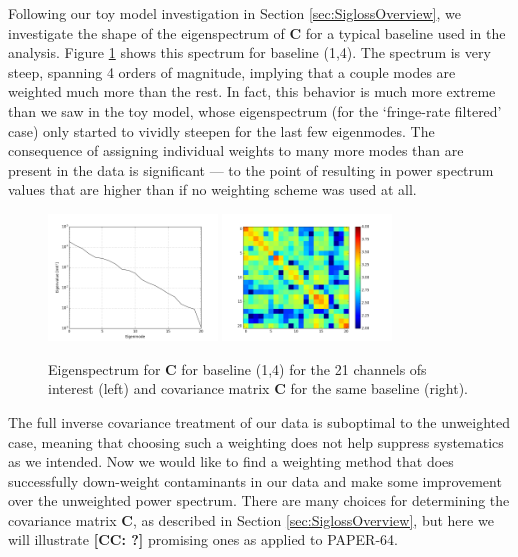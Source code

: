 \documentclass[preprint2,numberedappendix,tighten]{aastex6}  %
\newcommand{\cc}[1]{{\color{purple} \textbf{[CC: #1]}}}
\begin{document}
Following our toy model investigation in Section \ref{sec:SiglossOverview}, we investigate the shape of the eigenspectrum of $\textbf{C}$ for a typical baseline used in the analysis. Figure \ref{fig:eigenspectrum} shows this spectrum for baseline (1,4). The spectrum is very steep, spanning 4 orders of magnitude, implying that a couple modes are weighted much more than the rest. In fact, this behavior is much more extreme than we saw in the toy model, whose eigenspectrum (for the `fringe-rate filtered' case) only started to vividly steepen for the last few eigenmodes. The consequence of assigning individual weights to many more modes than are present in the data is significant --- to the point of resulting in power spectrum values that are higher than if no weighting scheme was used at all.

\begin{figure}
	\centering
	\includegraphics[width=0.4\textwidth]{plots/eigenspectrum.png}
	\includegraphics[width=0.4\textwidth]{plots/covariance.png}
	\caption{Eigenspectrum for $\textbf{C}$ for baseline (1,4) for the 21 channels ofs interest (left) and covariance matrix $\textbf{C}$ for the same baseline (right).}
	\label{fig:eigenspectrum}
\end{figure}

The full inverse covariance treatment of our data is suboptimal to the unweighted case, meaning that choosing such a weighting does not help suppress systematics as we intended. Now we would like to find a weighting method that does successfully down-weight contaminants in our data and make some improvement over the unweighted power spectrum. There are many choices for determining the covariance matrix $\textbf{C}$, as described in Section \ref{sec:SiglossOverview}, but here we will illustrate \cc{?} promising ones as applied to PAPER-64.
\end{document}
